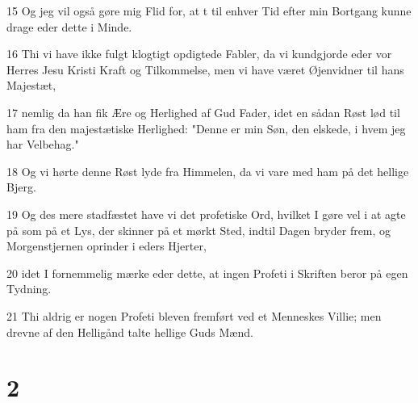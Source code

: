 \par 15 Og jeg vil også gøre mig Flid for, at t til enhver Tid efter min Bortgang kunne drage eder dette i Minde.
\par 16 Thi vi have ikke fulgt klogtigt opdigtede Fabler, da vi kundgjorde eder vor Herres Jesu Kristi Kraft og Tilkommelse, men vi have været Øjenvidner til hans Majestæt,
\par 17 nemlig da han fik Ære og Herlighed af Gud Fader, idet en sådan Røst lød til ham fra den majestætiske Herlighed: "Denne er min Søn, den elskede, i hvem jeg har Velbehag."
\par 18 Og vi hørte denne Røst lyde fra Himmelen, da vi vare med ham på det hellige Bjerg.
\par 19 Og des mere stadfæstet have vi det profetiske Ord, hvilket I gøre vel i at agte på som på et Lys, der skinner på et mørkt Sted, indtil Dagen bryder frem, og Morgenstjernen oprinder i eders Hjerter,
\par 20 idet I fornemmelig mærke eder dette, at ingen Profeti i Skriften beror på egen Tydning.
\par 21 Thi aldrig er nogen Profeti bleven fremført ved et Menneskes Villie; men drevne af den Helligånd talte hellige Guds Mænd.

\chapter{2}

